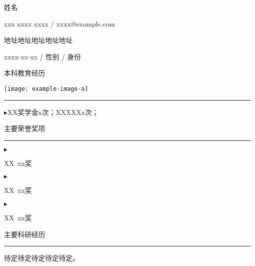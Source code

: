 \documentclass{resume}
\begin{document}
\begin{minipage}{0.51 \textwidth} 
	{\Large\heiti 姓名}

    xxx xxxx xxxx / xxxx@example.com

    地址地址地址地址地址

    xxxx-xx-xx / 性别 / 身份

    \bigskip

    {\large\heiti 本科教育经历}

\end{minipage}
\hspace{\fill}
\begin{minipage}{0.16\textwidth}
    \texttt{[image: example-image-a]}
\end{minipage}



\smallskip
\hrule
\medskip




$\blacktriangleright$XX奖学金x次；XXXXXx次；

\bigskip

{\large\heiti 主要荣誉奖项}

\smallskip
\hrule
\medskip

$\blacktriangleright$

XX\ xx奖

$\blacktriangleright$

XX\ xx奖

$\blacktriangleright$

XX\ xx奖

\bigskip

{\large\heiti 主要科研经历}

\smallskip
\hrule
\medskip


\hspace*{2em}待定待定待定待定待定。
\end{document}
